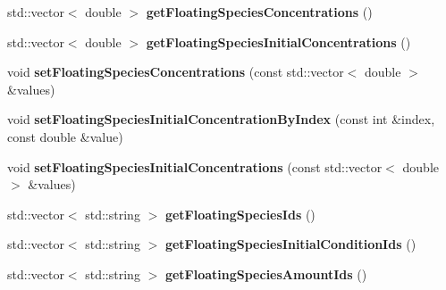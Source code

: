 \begin{DoxyCompactItemize}
\item 
\hypertarget{classrr_1_1_road_runner_a8bfb3b2b523a9448617b99568e4af757}{std\-::vector$<$ double $>$ {\bfseries get\-Floating\-Species\-Concentrations} ()}\label{classrr_1_1_road_runner_a8bfb3b2b523a9448617b99568e4af757}

\item 
\hypertarget{classrr_1_1_road_runner_ae123a31ab81aa07d8e67f385608fb8da}{std\-::vector$<$ double $>$ {\bfseries get\-Floating\-Species\-Initial\-Concentrations} ()}\label{classrr_1_1_road_runner_ae123a31ab81aa07d8e67f385608fb8da}

\item 
\hypertarget{classrr_1_1_road_runner_a5e1dcd14759e468e510a298f61b267de}{void {\bfseries set\-Floating\-Species\-Concentrations} (const std\-::vector$<$ double $>$ \&values)}\label{classrr_1_1_road_runner_a5e1dcd14759e468e510a298f61b267de}

\item 
\hypertarget{classrr_1_1_road_runner_a08176e93872548591ce96b2f9c20dc74}{void {\bfseries set\-Floating\-Species\-Initial\-Concentration\-By\-Index} (const int \&index, const double \&value)}\label{classrr_1_1_road_runner_a08176e93872548591ce96b2f9c20dc74}

\item 
\hypertarget{classrr_1_1_road_runner_a3c85d3178f85ec302f1dd8f13fb87aa8}{void {\bfseries set\-Floating\-Species\-Initial\-Concentrations} (const std\-::vector$<$ double $>$ \&values)}\label{classrr_1_1_road_runner_a3c85d3178f85ec302f1dd8f13fb87aa8}

\item 
\hypertarget{classrr_1_1_road_runner_a40a8147fbf0732416b0f0cbdf405158c}{std\-::vector$<$ std\-::string $>$ {\bfseries get\-Floating\-Species\-Ids} ()}\label{classrr_1_1_road_runner_a40a8147fbf0732416b0f0cbdf405158c}

\item 
\hypertarget{classrr_1_1_road_runner_a60d71f2afe4aaedac4226fb3d4093a52}{std\-::vector$<$ std\-::string $>$ {\bfseries get\-Floating\-Species\-Initial\-Condition\-Ids} ()}\label{classrr_1_1_road_runner_a60d71f2afe4aaedac4226fb3d4093a52}

\item 
\hypertarget{classrr_1_1_road_runner_a2063359eac303ac7b18ea275bdc78372}{std\-::vector$<$ std\-::string $>$ {\bfseries get\-Floating\-Species\-Amount\-Ids} ()}\label{classrr_1_1_road_runner_a2063359eac303ac7b18ea275bdc78372}


\end{DoxyCompactItemize}
